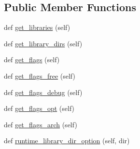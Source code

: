 \subsection*{Public Member Functions}
\begin{DoxyCompactItemize}
\item 
def \hyperlink{classnumpy_1_1distutils_1_1fcompiler_1_1pg_1_1PGroupFlangCompiler_a33c47a0f377de40b0cb089a8fa741cc4}{get\+\_\+libraries} (self)
\item 
def \hyperlink{classnumpy_1_1distutils_1_1fcompiler_1_1pg_1_1PGroupFlangCompiler_adc35f6d60449c9ede96984489e24086c}{get\+\_\+library\+\_\+dirs} (self)
\item 
def \hyperlink{classnumpy_1_1distutils_1_1fcompiler_1_1pg_1_1PGroupFlangCompiler_ae8ce09bb44ee6056ebb22341802b151b}{get\+\_\+flags} (self)
\item 
def \hyperlink{classnumpy_1_1distutils_1_1fcompiler_1_1pg_1_1PGroupFlangCompiler_ab6b49862121284698a1104dbb29c9691}{get\+\_\+flags\+\_\+free} (self)
\item 
def \hyperlink{classnumpy_1_1distutils_1_1fcompiler_1_1pg_1_1PGroupFlangCompiler_a8fe4886e3b1127c50c076e2b7e87b8ec}{get\+\_\+flags\+\_\+debug} (self)
\item 
def \hyperlink{classnumpy_1_1distutils_1_1fcompiler_1_1pg_1_1PGroupFlangCompiler_aa197a85015f92a2540a00130a8bb28f0}{get\+\_\+flags\+\_\+opt} (self)
\item 
def \hyperlink{classnumpy_1_1distutils_1_1fcompiler_1_1pg_1_1PGroupFlangCompiler_af035095789eb31052637d865be2a4711}{get\+\_\+flags\+\_\+arch} (self)
\item 
def \hyperlink{classnumpy_1_1distutils_1_1fcompiler_1_1pg_1_1PGroupFlangCompiler_a955322327ff6e3db14924e6fed22382a}{runtime\+\_\+library\+\_\+dir\+\_\+option} (self, dir)
\end{DoxyCompactItemize}
